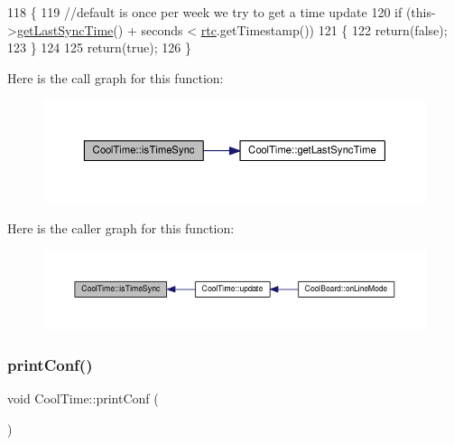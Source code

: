 \begin{DoxyCode}
118 \{
119 \textcolor{comment}{//default is once per week we try to get a time update}
120     \textcolor{keywordflow}{if} (this->\hyperlink{classCoolTime_a5d17f707a9d337720493b2bce9d41c21}{getLastSyncTime}() + seconds < \hyperlink{classCoolTime_afa77d58c0c21cfe8b7c27e34d82f07b9}{rtc}.getTimestamp()) 
121     \{           
122         \textcolor{keywordflow}{return}(\textcolor{keyword}{false});
123     \}
124 
125 \textcolor{keywordflow}{return}(\textcolor{keyword}{true});
126 \}
\end{DoxyCode}
Here is the call graph for this function\+:
\nopagebreak
\begin{figure}[H]
\begin{center}
\leavevmode
\includegraphics[width=350pt]{classCoolTime_a5ae038a4498602b189f76a10bf02adf8_cgraph}
\end{center}
\end{figure}
Here is the caller graph for this function\+:
\nopagebreak
\begin{figure}[H]
\begin{center}
\leavevmode
\includegraphics[width=350pt]{classCoolTime_a5ae038a4498602b189f76a10bf02adf8_icgraph}
\end{center}
\end{figure}
\mbox{\label{classCoolTime_af355e7f9b3898211cd2ff25eab5933b1}} 
\subsubsection{\texorpdfstring{print\+Conf()}{printConf()}}
{\footnotesize\ttfamily void Cool\+Time\+::print\+Conf (\begin{DoxyParamCaption}{ }\end{DoxyParamCaption})}

